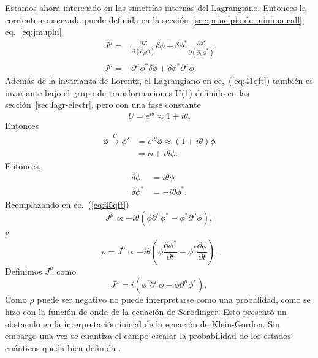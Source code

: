 Estamos ahora interesado en las simetrías internas del Lagrangiano. Entonces la corriente conservada puede definida en la sección~\ref{sec:principio-de-minima-call}, eq.~\eqref{eq:jmuphi}
\begin{align}
  J^\mu=&\frac{\partial\mathcal{L}}{\partial(\partial_\mu\phi)}\delta\phi+\delta\phi^*\frac{\partial\mathcal{L}}{\partial(\partial_\mu\phi^*)}\nonumber\\
  \label{eq:45qft}
  J^\mu=&\partial^\mu\phi^*\delta\phi+\delta\phi^*\partial^\mu\phi.
\end{align}
Además de la invarianza de Lorentz, el Lagrangiano en ec,~(\ref{eq:41qft}) también es invariante bajo el grupo de transformaciones U(1) definido en las sección~\ref{sec:lagr-electr}, pero con una fase constante
\begin{equation*}
  U=e^{i\theta}\approx1+i\theta.
\end{equation*}
Entonces
\begin{align}
  \phi\overset{U}{\longrightarrow}\phi'&=e^{i\theta}\phi\approx(1+i\theta)\phi\nonumber\\
  &=\phi+i\theta\phi.
\end{align}
Entonces,
\begin{align}
  \delta\phi&=i\theta\phi\\
  \delta\phi^*&=-i\theta\phi^*.
\end{align}
Reemplazando en ec.~(\ref{eq:45qft})
\begin{equation}
\label{eq:46qft}
  J^\mu\propto -i\theta(\phi\partial^\mu\phi^*-\phi^*\partial^\mu\phi),
\end{equation}
y
\begin{equation}
\label{eq:47qft}
  \rho=J^0\propto-i\theta(\phi\frac{\partial\phi^*}{\partial t}-\phi^*\frac{\partial\phi}{\partial t}).
\end{equation}
Definimos $J^\mu$ como
\begin{equation}
  \label{eq:48qft}
   J^\mu= i(\phi^*\partial^\mu\phi-\phi\partial^\mu\phi^*),
\end{equation}
Como $\rho$ puede ser negativo no puede interpretarse como una
probalidad, como se hizo con la función de onda de la ecuación de
Scrödinger. Esto presentó un obstaculo en la interpretación inicial de
la ecuación de Klein-Gordon. Sin embargo una vez se cuantiza el
campo escalar la probabilidad de los estados cuánticos queda bien
definida \cite{Gross}. 



